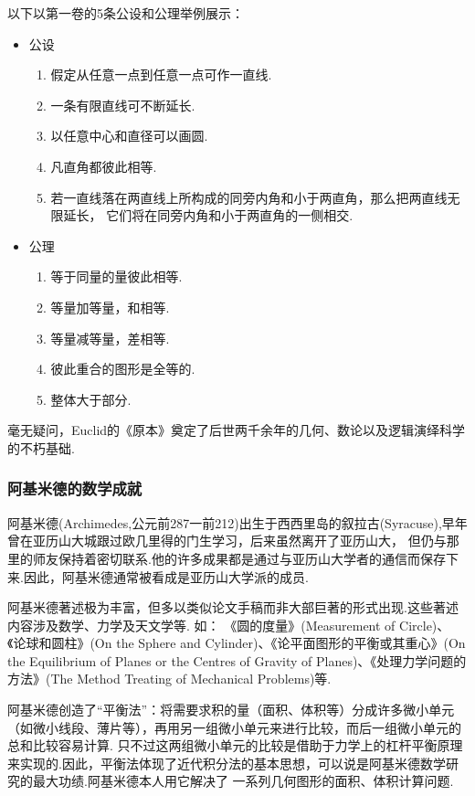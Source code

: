 \documentclass{Math_Note}
\begin{document}
以下以第一卷的5条公设和公理举例展示：
\begin{itemize}
    \item 公设
    \begin{enumerate}
        \item 假定从任意一点到任意一点可作一直线.
        \item 一条有限直线可不断延长.
        \item 以任意中心和直径可以画圆.
        \item 凡直角都彼此相等.
        \item 若一直线落在两直线上所构成的同旁内角和小于两直角，那么把两直线无限延长，
        它们将在同旁内角和小于两直角的一侧相交.
    \end{enumerate}
    \item 公理
    \begin{enumerate}
        \item 等于同量的量彼此相等.
        \item 等量加等量，和相等.
        \item 等量减等量，差相等.
        \item 彼此重合的图形是全等的.
        \item 整体大于部分.
    \end{enumerate}
\end{itemize}

毫无疑问，Euclid的《原本》奠定了后世两千余年的几何、数论以及逻辑演绎科学的不朽基础.

\subsubsection{阿基米德的数学成就}
阿基米德(Archimedes,公元前287一前212)出生于西西里岛的叙拉古(Syracuse),早年曾在亚历山大城跟过欧几里得的门生学习，后来虽然离开了亚历山大，
但仍与那里的师友保持着密切联系.他的许多成果都是通过与亚历山大学者的通信而保存下来.因此，阿基米德通常被看成是亚历山大学派的成员.

阿基米德著述极为丰富，但多以类似论文手稿而非大部巨著的形式出现.这些著述内容涉及数学、力学及天文学等. 如：
《圆的度量》(Measurement of Circle)、《论球和圆柱》(On the Sphere and Cylinder)、《论平面图形的平衡或其重心》(On the Equilibrium of Planes 
or the Centres of Gravity of Planes)、《处理力学问题的方法》(The Method Treating of Mechanical Problems)等.

阿基米德创造了“平衡法”：将需要求积的量（面积、体积等）分成许多微小单元（如微小线段、薄片等），再用另一组微小单元来进行比较，而后一组微小单元的总和比较容易计算.
只不过这两组微小单元的比较是借助于力学上的杠杆平衡原理来实现的.因此，平衡法体现了近代积分法的基本思想，可以说是阿基米德数学研究的最大功绩.阿基米德本人用它解决了
一系列几何图形的面积、体积计算问题.
\end{document}

